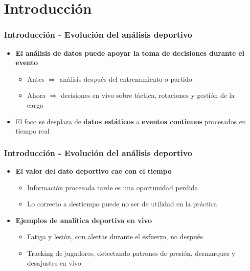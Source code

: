 \documentclass[aspectratio=169]{beamer}
\begin{document}
\section{Introducción}

\begin{frame}\frametitle{Introducción - Evolución del análisis deportivo}
	\begin{itemize}
		\item \textbf{El análisis de datos puede apoyar la toma de decisiones durante el evento}
		\begin{itemize}
			\item Antes $\Rightarrow$ análisis después del entrenamiento o partido
			\item Ahora $\Rightarrow$ decisiones en vivo sobre táctica, rotaciones y gestión de la carga
		\end{itemize}

		\vspace{1em}

		\item El foco se desplaza de \textbf{datos estáticos} a \textbf{eventos continuos} procesados en tiempo real
	\end{itemize}
\end{frame}


\begin{frame}\frametitle{Introducción - Evolución del análisis deportivo}
	\begin{itemize}
		\item \textbf{El valor del dato deportivo cae con el tiempo}
		\begin{itemize}
      \item Información procesada tarde es una oportunidad perdida
      \item Lo correcto a destiempo puede no ser de utilidad en la práctica
    \end{itemize}

    \vspace{1em}
      
    \item \textbf{Ejemplos de analítica deportiva en vivo}
		\begin{itemize}
			\item Fatiga y lesión, con alertas durante el esfuerzo, no después
			\item Tracking de jugadores, detectando patrones de presión, desmarques y desajustes en vivo
		\end{itemize}
	\end{itemize}
\end{frame}
\end{document}
